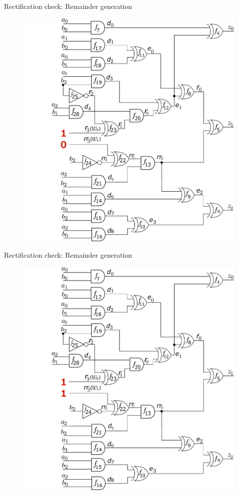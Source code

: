 \begin{frame}{\large Rectification check: Remainder generation}
\begin{figure}[hbt]
\centering
    \includegraphics[scale = 0.28]{mas_3_ddc_mfr_b_01.pdf}
    \caption*{}
\end{figure}
\end{frame}

\begin{frame}{\large Rectification check: Remainder generation}
\begin{figure}[hbt]
\centering
    \includegraphics[scale = 0.28]{mas_3_ddc_mfr_b_11.pdf}
    \caption*{}
\end{figure}
\end{frame}

